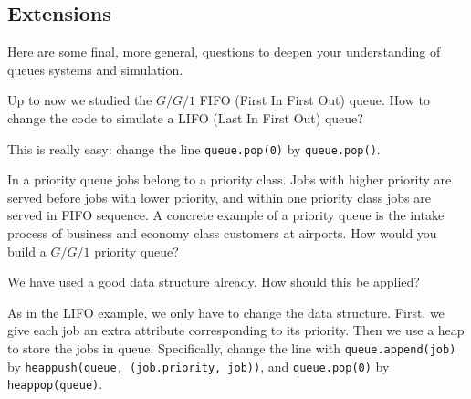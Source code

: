 \documentclass{scrartcl}
\begin{document}
\subsection{Extensions}
\label{sec:extensions}

Here are some final, more general, questions to deepen your understanding of queues systems and simulation. 

\begin{exercise}
  Up to now we studied the $G/G/1$ FIFO (First In First Out) queue. How to change the code to simulate a LIFO (Last In First Out) queue?
  \begin{solution}
    This is really easy: change the line \texttt{queue.pop(0)} by  \texttt{queue.pop()}. 
 \end{solution}
\end{exercise}

\begin{exercise}
  In a priority queue  jobs belong to a priority class. Jobs with higher priority are served before jobs with lower priority, and within one priority class jobs are served in FIFO sequence. A concrete example of a priority queue is the intake process of business and economy class customers at airports.  How would you build a $G/G/1$ priority queue?
  \hintsymbol\begin{hint}
We have used a good data structure already. How should this be applied?
  \end{hint}
\begin{solution}
  As in the LIFO example, we only have to change the data structure. First, we give each job an extra attribute corresponding to its priority. Then we use a heap to store the jobs in queue. Specifically,  change the line with
\texttt{queue.append(job)} by \texttt{heappush(queue, (job.priority, job))}, and \texttt{queue.pop(0)} by \texttt{heappop(queue)}. 

\end{solution}
\end{exercise}
\end{document}
